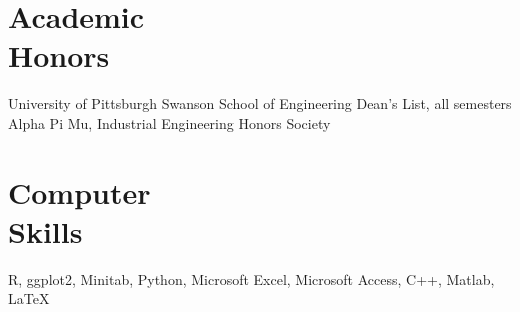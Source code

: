 \documentclass[margin]{res}
\begin{document}
\begin{resume}
\section{Academic \\ Honors} 
University of Pittsburgh Swanson School of Engineering Dean's List, all semesters \\
Alpha Pi Mu, Industrial Engineering Honors Society


\section{Computer \\ Skills}
R, ggplot2, Minitab, Python, Microsoft Excel, Microsoft Access, C++, Matlab, LaTeX\\



\end{resume} 
\end{document}
